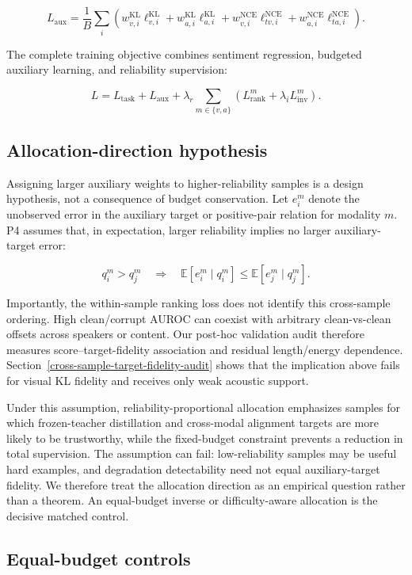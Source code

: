 \[
L_{\mathrm{aux}}=
\frac{1}{B}\sum_i\left(
w_{v,i}^{\mathrm{KL}}\ell_{v,i}^{\mathrm{KL}}
+w_{a,i}^{\mathrm{KL}}\ell_{a,i}^{\mathrm{KL}}
+w_{v,i}^{\mathrm{NCE}}\ell_{tv,i}^{\mathrm{NCE}}
+w_{a,i}^{\mathrm{NCE}}\ell_{ta,i}^{\mathrm{NCE}}
\right).
\]

The complete training objective combines sentiment regression, budgeted
auxiliary learning, and reliability supervision:

\[
L=L_{\mathrm{task}}+L_{\mathrm{aux}}
+\lambda_r\sum_{m\in\{v,a\}}
\left(L_{\mathrm{rank}}^m+\lambda_iL_{\mathrm{inv}}^m\right).
\]

\subsection{Allocation-direction
hypothesis}\label{allocation-direction-hypothesis}

Assigning larger auxiliary weights to higher-reliability samples is a design
hypothesis, not a consequence of budget conservation. Let \(e_i^m\) denote
the unobserved error in the auxiliary target or positive-pair relation for
modality \(m\). P4 assumes that, in expectation, larger reliability implies
no larger auxiliary-target error:

\[
q_i^m>q_j^m
\quad\Longrightarrow\quad
\mathbb E[e_i^m\mid q_i^m]\le
\mathbb E[e_j^m\mid q_j^m].
\]

Importantly, the within-sample ranking loss does not identify this cross-sample
ordering. High clean/corrupt AUROC can coexist with arbitrary clean-vs-clean
offsets across speakers or content. Our post-hoc validation audit therefore
measures score--target-fidelity association and residual length/energy
dependence. Section~\ref{cross-sample-target-fidelity-audit} shows that the
implication above fails for visual KL fidelity and receives only weak acoustic
support.

Under this assumption, reliability-proportional allocation emphasizes samples
for which frozen-teacher distillation and cross-modal alignment targets are
more likely to be trustworthy, while the fixed-budget constraint prevents a
reduction in total supervision. The assumption can fail: low-reliability
samples may be useful hard examples, and degradation detectability need not
equal auxiliary-target fidelity. We therefore treat the allocation direction
as an empirical question rather than a theorem. An equal-budget inverse or
difficulty-aware allocation is the decisive matched control.

\subsection{Equal-budget controls}\label{equal-budget-controls}

